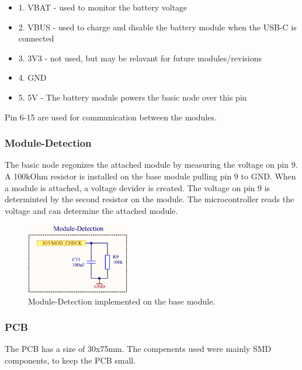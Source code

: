     \begin{itemize}
        \item 1. VBAT - used to monitor the battery voltage
        \item 2. VBUS - used to charge and disable the battery module when the USB-C 
        is connected
        \item 3. 3V3 - not used, but may be relavant for future modules/revisions
        \item 4. GND
        \item 5. 5V - The battery module powers the basic node over this pin
    \end{itemize}

    Pin 6-15 are used for communication between the modules. 


    \subsubsection{Module-Detection}
    
    The basic node regonizes the attached module by measuring the voltage on pin 9.
    A 100kOhm resistor is installed on the base module pulling pin 9 to GND. 
    When a module is attached, a voltage devider is created. The voltage on pin 9 is 
    determinted by the second resistor on the module. The microcontroller reads the
    voltage and can determine the attached module. 
    
    \begin{figure}[H]
        \centering
        \includegraphics[width=0.4\textwidth]{assets/HW/Module-Detection-schematic.png}
        \caption{Module-Detection implemented on the base module.}
    \end{figure}

    \subsubsection{PCB}

    The PCB has a size of 30x75mm. The compenents used were mainly SMD components, 
    to keep the PCB small. 

